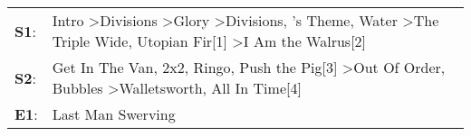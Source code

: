 \begin{supertabular}{p{0.03\textwidth}p{0.92\textwidth}}
 \textbf{S1}:  &  Intro\textsuperscript{} \textgreater \enspace Divisions\textsuperscript{} \textgreater \enspace Glory\textsuperscript{} \textgreater \enspace Divisions\textsuperscript{}, 's Theme\textsuperscript{}, \enspace Water\textsuperscript{} \textgreater \enspace The Triple Wide\textsuperscript{}, \enspace Utopian Fir[1]\textsuperscript{} \textgreater \enspace I Am the Walrus[2]\textsuperscript{}  \enspace  \\
 \textbf{S2}:  &                                                                           Get In The Van\textsuperscript{}, \enspace 2x2\textsuperscript{}, \enspace Ringo\textsuperscript{}, \enspace Push the Pig[3]\textsuperscript{} \textgreater \enspace Out Of Order\textsuperscript{}, \enspace Bubbles\textsuperscript{} \textgreater \enspace Walletsworth\textsuperscript{}, \enspace All In Time[4]\textsuperscript{}  \enspace  \\
 \textbf{E1}:  &                                                                                                                                                                                                                                                                                                                                                                               Last Man Swerving\textsuperscript{}  \enspace  \\
\end{supertabular}
